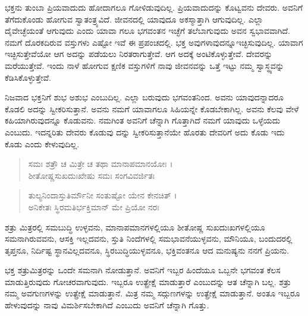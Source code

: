 ಭಕ್ತನು ತುಂಬಾ ಪ್ರಿಯವಾದುದು ಹೋದಾಗಲೂ ಗೋಳಿಡುವುದಿಲ್ಲ. ಪ್ರಿಯವಾದುದನ್ನು ಕೊಟ್ವವನು ದೇವರು. ಅವನಿಗೆ ತೆಗೆದುಕೊಂಡು ಹೋಗುವ ಸ್ವಾತಂತ್ರ್ಯವಿದೆ. ಜೀವನದಲ್ಲಿ ಯಾವುದೂ ಅಕಸ್ಮಾತ್ತಾಗಿ ಆಗುವುದಿಲ್ಲ. ಎಲ್ಲಾ ದೈವೇಚ್ಛೆಯಂತೆ ಆಗುವುದು ಎಂದು ಯಾವಾ ಗಲೂ ಭಗವಂತನ ಇಚ್ಛೆಗೆ ತಲೆಬಾಗುವುದು ಅವನ ಸ್ವಭಾವವಾಗಿದೆ. ನಮಗೆ ದೊರಕದಿರುವ ವಸ್ತುಗಳು ಎಷ್ಟೋ ಇವೆ ಈ ಪ್ರಪಂಚದಲ್ಲಿ. ಭಕ್ತ ಅವುಗಳಾವುದನ್ನೂಇಚ್ಛಿಸುವುದಿಲ್ಲ. ಯಾವಾಗ ಇಚ್ಛಿಸುತ್ತೇವೆಯೋ ಆಗ ಅದನ್ನು ಪಡೆಯಲು ನಿರತರಾಗುತ್ತೇವೆ. ಆಗ ಅದಕ್ಕೆ ಅಂಟಿಕೊಳ್ಳುತ್ತೇವೆ. ದೇವರನ್ನು ಮರೆಯುತ್ತೇವೆ. ಇಂದು ನಾಳೆ ಹೋಗುವ ಕ್ಷಣಿಕ ವಸ್ತುಗಳಿಗೆ ನಾವು ಜೀವನವನ್ನು ಒತ್ತೆ ಇಟ್ಟು ನಮ್ಮ ಸ್ವಾಸ್ಥ್ಯವನ್ನು ಕೆಡಿಸಿಕೊಳ್ಳುತ್ತೇವೆ.

ನಿಜವಾದ ಭಕ್ತನಿಗೆ ಶುಭ ಅಶುಭ ಎಂಬುದಿಲ್ಲ. ಎಲ್ಲಾ ಬರುವುದು ಭಗವಂತನಿಂದ. ಅವನು ಯಾವುದನ್ನಾದರೂ ಕೊಡಲಿ ಅದನ್ನು ಸ್ವೀಕರಿಸುತ್ತಾನೆ. ಅವನು ನಮಗೆ ಯಾವಾಗಲೂ ಸಿಹಿಯನ್ನೇ ಕೊಡಬೇಕಾಗಿಲ್ಲ. ಅವನು ಕೆಲವು ವೇಳೆ ಕಹಿಯಾಗಿರುವುದನ್ನೂ ಕೊಡುವನು. ನಮಗಿಂತ ಅವನಿಗೆ ಚೆನ್ನಾಗಿ ಗೊತ್ತಾಗಿದೆ ನಮಗೆ ಯಾವುದು ಒಳ್ಳೆಯದು ಎಂಬುದು. ಇದನ್ನರಿತು ದೇವರು ಕೊಡುವು ದನ್ನು ಸ್ವೀಕರಿಸುತ್ತಾನೆಯೇ ಹೊರತು ದೇವರಿಗೆ ಅದು ಕೊಡು ಇದು ಕೊಡು ಎಂದು ಕೇಳುವುದಿಲ್ಲ.

\begin{verse}
ಸಮಃ ಶತ್ರೌ ಚ ಮಿತ್ರೇ ಚ ತಥಾ ಮಾನಾಪಮಾನಯೋಃ ।\\ಶೀತೋಷ್ಣಸುಖದುಃಖೇಷು ಸಮಃ ಸಂಗವಿವರ್ಜಿತಃ 
\end{verse}

\begin{verse}
ತುಲ್ಯನಿಂದಾಸ್ತುತಿರ್ಮೌನೀ ಸಂತುಷ್ಟೋ ಯೇನ ಕೇನಚಿತ್ ।\\ಅನಿಕೇತಃ ಸ್ಥಿರಮತಿರ್ಭಕ್ತಿಮಾನ್ ಮೇ ಪ್ರಿಯೋ ನರಃ 
\end{verse}

{\small ಶತ್ರು ಮಿತ್ರರಲ್ಲಿ ಸಮಬುದ್ಧಿ ಉಳ್ಳವನು, ಮಾನಾಪಮಾನಗಳಲ್ಲಿಯೂ ಶೀತೋಷ್ಣ ಸುಖದುಃಖಗಳಲ್ಲಿಯೂ ಸಮನಾಗಿರುವವನು, ಆಸಕ್ತಿ ಇಲ್ಲದವನು, ಸ್ತುತಿ ನಿಂದೆಗಳಲ್ಲಿ ಸಮಭಾವನೆಯುಳ್ಳವನು, ಮೌನಿಯೂ, ಬಂದುದರಲ್ಲಿ ತೃಪ್ತನೂ, ನಿರ್ದಿಷ್ಟ ಸ್ಥಾನವಿಲ್ಲದವನೂ, ಸ್ಥಿರಬುದ್ಧಿಯುಳ್ಳವನೂ, ಭಕ್ತಿವಂತನೂ ಆದ ಮನುಷ್ಯನು ನನಗೆ ಪ್ರಿಯನು.}

ಭಕ್ತ ಶತ್ರುಮಿತ್ರರನ್ನು ಒಂದೇ ಸಮನಾಗಿ ನೋಡುತ್ತಾನೆ. ಅವನಿಗೆ ಇಬ್ಬರ ಹಿಂದೆಯೂ ಒಬ್ಬನೇ ಭಗವಂತ ಕೆಲಸ ಮಾಡುತ್ತಿರುವುದು ಗೋಚರವಾಗುವುದು. ಇಬ್ಬರೂ ಉತ್ಪ್ರೇಕ್ಷೆ ಮಾಡುತ್ತಾರೆ ಎಂಬುದನ್ನು ಆತ ಚೆನ್ನಾಗಿ ಬಲ್ಲ. ಶತ್ರು ನಮ್ಮ ಅವಗುಣಗಳನ್ನು ಉತ್ಪ್ರೇಕ್ಷೆ ಮಾಡುತ್ತಾನೆ. ಮಿತ್ರ ನಮ್ಮ ಸದ್ಗುಣಗಳನ್ನು ಉತ್ಪ್ರೇಕ್ಷೆ ಮಾಡುತ್ತಾನೆ. ಅಂತೂ ಇಬ್ಬರೂ ಹೇಳುವುದನ್ನು ನಾವು ವಿಮರ್ಶಿಸಬೇಕಾಗಿದೆ ಎಂಬುದು ಅವನಿಗೆ ಚೆನ್ನಾಗಿ ಗೊತ್ತು.

